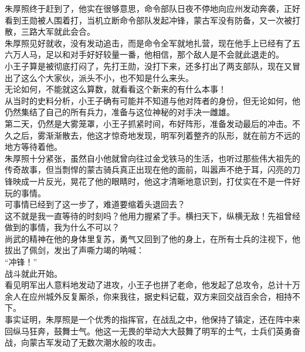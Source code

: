 \begin{multicols}{\theparacolNo}
朱厚照终于赶到了，他实在很够意思，命令部队日夜不停地向应州发动奔袭，正好看到王勋被人围着打，当机立断命令部队发起冲锋，蒙古军没有防备，又一次被打散，三路大军就此会合。\\

朱厚照见好就收，没有发动追击，而是命令全军就地扎营，现在他手上已经有了五六万人马，足以和对手好好较量一番，他相信，那个敌人是不会就此退走的。\\

小王子算是被彻底打闷了，先打王勋，没打下来，还多打出了两支部队，现在又冒出了这么个大家伙，派头不小，也不知是什么来头。\\

无论如何，不能就这么算数，就看看这个新来的有什么本事！\\

从当时的史料分析，小王子确有可能并不知道与他对阵者的身份，但无论如何，他仍然集结了自己的所有兵力，准备与这位神秘的对手决一雌雄。\\

第二天，仍然是大雾笼罩，小王子抓紧时间，布好阵形，准备发动最后的冲击。不久之后，雾渐渐散去，他这才惊奇地发现，明军列着整齐的队形，就在前方不远的地方等待着他。\\

朱厚照十分紧张，虽然自小他就曾向往过金戈铁马的生活，也听过那些伟大祖先的传奇故事，但当剽悍的蒙古骑兵真正出现在他的面前，叫嚣声不绝于耳，闪亮的刀锋映成一片反光，晃花了他的眼睛时，他这才清晰地意识到，打仗实在不是一件好玩的事情。\\

可事情已经到了这一步了，难道要缩着头退回去？\\

这不就是我一直等待的时刻吗？他用力握紧了手。横扫天下，纵横无敌！先祖曾经做到的事情，我为什么不可以？\\

尚武的精神在他的身体里复苏，勇气又回到了他的身上，在所有士兵的注视下，他拔出了佩剑，发出了声嘶力竭的呐喊：\\

“冲锋！”\\

战斗就此开始。\\

看见明军出人意料地发动了进攻，小王子也拼了老命，他发起了总攻令，总计十万余人在应州城外反复厮杀，你来我往，据史料记载，双方来回交战百余合，相持不下。\\

事实证明，朱厚照是一个优秀的指挥官，在战乱之中，他保持了镇定，还在阵中来回纵马狂奔，鼓舞士气。他这一无畏的举动大大鼓舞了明军的士气，士兵们英勇奋战，向蒙古军发动了无数次潮水般的攻击。\\


\end{multicols}
